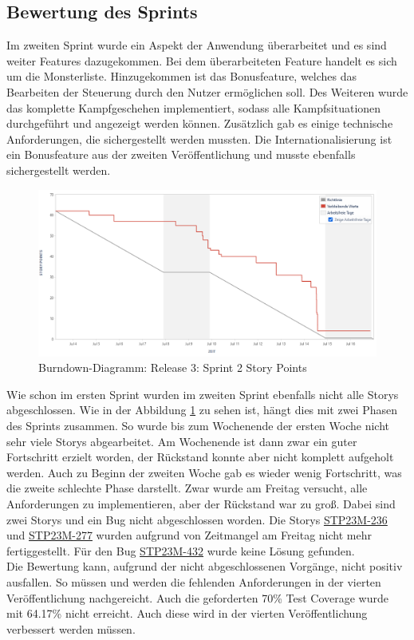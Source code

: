 \subsection{Bewertung des Sprints}
Im zweiten Sprint wurde ein Aspekt der Anwendung überarbeitet und es sind weiter Features dazugekommen. Bei dem überarbeiteten Feature handelt es sich um die Monsterliste. Hinzugekommen ist das Bonusfeature, welches das Bearbeiten der Steuerung durch den Nutzer ermöglichen soll. Des Weiteren wurde das komplette Kampfgeschehen implementiert, sodass alle Kampfsituationen durchgeführt und angezeigt werden können.  Zusätzlich gab es einige technische Anforderungen, die sichergestellt werden mussten. Die Internationalisierung ist ein Bonusfeature aus der zweiten Veröffentlichung und musste ebenfalls sichergestellt werden.\\
\begin{figure}[H]
    \center
    \includegraphics[height=0.5\textwidth]{images/burndown/sprint2Story.png}
    \caption{Burndown-Diagramm: Release 3: Sprint 2 Story Points}
    \label{fig: sprint2Story}
\end{figure}

Wie schon im ersten Sprint wurden im zweiten Sprint ebenfalls nicht alle Storys abgeschlossen. Wie in der Abbildung \ref{fig: sprint2Story} zu sehen ist, hängt dies mit zwei Phasen des Sprints zusammen. So wurde bis zum Wochenende der ersten Woche nicht sehr viele Storys abgearbeitet. Am Wochenende ist dann zwar ein guter Fortschritt erzielt worden, der Rückstand konnte aber nicht komplett aufgeholt werden. Auch zu Beginn der zweiten Woche gab es wieder wenig Fortschritt, was die zweite schlechte Phase darstellt. Zwar wurde am Freitag versucht, alle Anforderungen zu implementieren, aber der Rückstand war zu groß. Dabei sind zwei Storys und ein Bug nicht abgeschlossen worden. Die Storys \hyperlink{S236}{STP23M-236} und \hyperlink{S277}{STP23M-277} wurden aufgrund von Zeitmangel am Freitag nicht mehr fertiggestellt. Für den Bug \hyperlink{S432}{STP23M-432} wurde keine Lösung gefunden. \\ Die Bewertung kann, aufgrund der nicht abgeschlossenen Vorgänge, nicht positiv ausfallen. So müssen und werden die fehlenden Anforderungen in der vierten Veröffentlichung nachgereicht. Auch die geforderten 70\% Test Coverage wurde mit 64.17\% nicht erreicht. Auch diese wird in der vierten Veröffentlichung verbessert werden müssen.

